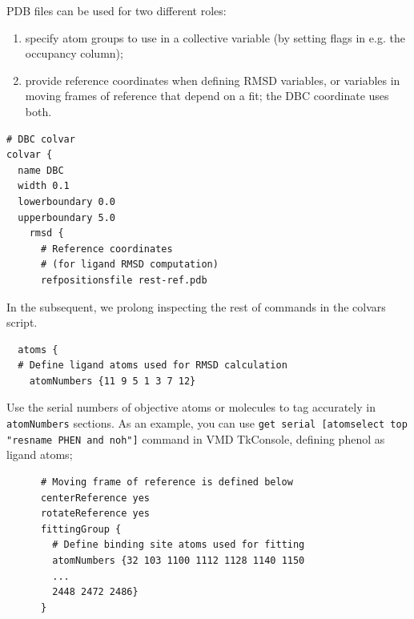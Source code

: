 \documentclass[9pt,tutorial]{livecoms}
\begin{document}
PDB files can be used for two different roles:
\begin{enumerate}
    \item specify atom groups to use in a collective variable (by setting flags in e.g. the occupancy column);
    \item provide reference coordinates when defining RMSD variables, or variables in moving frames of reference that depend on a fit; the DBC coordinate uses both.
\end{enumerate}




\begin{verbatim}
# DBC colvar
colvar {
  name DBC
  width 0.1
  lowerboundary 0.0
  upperboundary 5.0
    rmsd {
      # Reference coordinates
      # (for ligand RMSD computation)
      refpositionsfile rest-ref.pdb
      \end{verbatim} 

In the subsequent, we prolong inspecting the rest of commands in the colvars script.
\begin{verbatim}
  atoms {
  # Define ligand atoms used for RMSD calculation
    atomNumbers {11 9 5 1 3 7 12}
\end{verbatim}

Use the serial numbers of objective atoms or molecules to tag accurately in \texttt{atomNumbers} sections. As an example, you can use \texttt{get serial  [atomselect    top    "resname PHEN and noh"]} command in VMD TkConsole, defining phenol as ligand atoms;
\begin{verbatim}
      # Moving frame of reference is defined below
      centerReference yes
      rotateReference yes
      fittingGroup {
        # Define binding site atoms used for fitting
        atomNumbers {32 103 1100 1112 1128 1140 1150
        ...
        2448 2472 2486}
      }
\end{verbatim}
\end{document}
